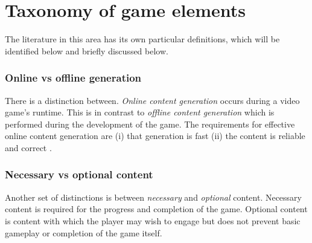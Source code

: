 \documentclass[11pt, a4paper, oneside]{report} %
\begin{document}







\section{Taxonomy of game elements}

The literature in this area has its own particular definitions, which will be identified below and
briefly discussed below.

\subsubsection{Online vs offline generation}

There is a distinction between. \textit{Online content generation} occurs during a video game's
runtime. This is in contrast to \textit{offline content generation} which is performed during the
development of the game. The requirements for effective online content generation are (i) that
generation is fast (ii) the content is reliable and correct \cite{5756645}.

\subsubsection{Necessary vs optional content}

Another set of distinctions is between \textit{necessary} and \textit{optional} content. Necessary
content is required for the progress and completion of the game. Optional content is content with
which the player may wish to engage but does not prevent basic gameplay or completion of the game
itself.
\end{document}
